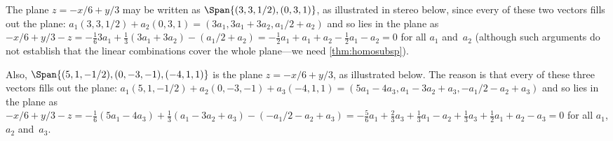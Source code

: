 \begin{example} \label{eg:plsubs}
The plane \(z=-x/6+y/3\) may be written as \(\Span\{(3,3,1/2),(0,3,1)\}\), as illustrated in stereo below, since every  of these two vectors fills out the plane: \(a_1(3,3,1/2)+a_2(0,3,1) =(3a_1,3a_1+3a_2,a_1/2+a_2)\) and so lies in the plane as \(-x/6+y/3-z=-\frac163a_1+\frac13(3a_1+3a_2)-(a_1/2+a_2) =-\frac12a_1+a_1+a_2-\frac12a_1-a_2=0\) for all \(a_1\) and~\(a_2\) (although such arguments do not establish that the linear combinations cover the whole plane---we need \cref{thm:homosubsp}).
\begin{center}
 {}
\end{center}
Also,  \(\Span\{(5,1,-1/2),(0,-3,-1),(-4,1,1)\}\) is the  plane \(z=-x/6+y/3\), as illustrated below. 
The reason is that every  of these three vectors fills out the plane: \(a_1(5,1,-1/2)+a_2(0,-3,-1)+a_3(-4,1,1) =(5a_1-4a_3, a_1-3a_2+a_3, -a_1/2-a_2+a_3)\) and so lies in the plane as \(-x/6+y/3-z=-\frac16(5a_1-4a_3)+\frac13(a_1-3a_2+a_3)-(-a_1/2-a_2+a_3) =-\frac56a_1+\frac23a_3+\frac13a_1-a_2+\frac13a_3+\frac12a_1+a_2-a_3 =0\) for all \(a_1\), \(a_2\) and~\(a_3\).
\begin{center}
 {}
\end{center}
\end{example}

